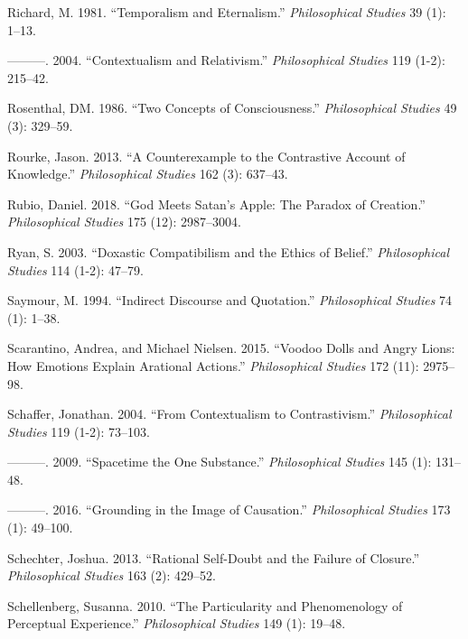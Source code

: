\documentclass[
  10pt,
  letterpaper,
  DIV=11,
  numbers=noendperiod,
  twoside]{scrartcl}
\newlength{\cslhangindent}
\newenvironment{CSLReferences}[2] %
 {\begin{list}{}{%
  \setlength{\itemindent}{0pt}
  \setlength{\leftmargin}{0pt}
  \setlength{\parsep}{0pt}
  \ifodd #1
   \setlength{\leftmargin}{\cslhangindent}
   \setlength{\itemindent}{-1\cslhangindent}
  \fi
  \setlength{\itemsep}{#2\baselineskip}}}
 {\end{list}}
\begin{document}
\begin{CSLReferences}{1}{0}
Richard, M. 1981. {``Temporalism and Eternalism.''} \emph{Philosophical
Studies} 39 (1): 1--13.

---------. 2004. {``Contextualism and Relativism.''} \emph{Philosophical
Studies} 119 (1-2): 215--42.

Rosenthal, DM. 1986. {``Two Concepts of Consciousness.''}
\emph{Philosophical Studies} 49 (3): 329--59.

Rourke, Jason. 2013. {``A Counterexample to the Contrastive Account of
Knowledge.''} \emph{Philosophical Studies} 162 (3): 637--43.

Rubio, Daniel. 2018. {``God Meets Satan's Apple: The Paradox of
Creation.''} \emph{Philosophical Studies} 175 (12): 2987--3004.

Ryan, S. 2003. {``Doxastic Compatibilism and the Ethics of Belief.''}
\emph{Philosophical Studies} 114 (1-2): 47--79.

Saymour, M. 1994. {``Indirect Discourse and Quotation.''}
\emph{Philosophical Studies} 74 (1): 1--38.

Scarantino, Andrea, and Michael Nielsen. 2015. {``Voodoo Dolls and Angry
Lions: How Emotions Explain Arational Actions.''} \emph{Philosophical
Studies} 172 (11): 2975--98.

Schaffer, Jonathan. 2004. {``From Contextualism to Contrastivism.''}
\emph{Philosophical Studies} 119 (1-2): 73--103.

---------. 2009. {``Spacetime the One Substance.''} \emph{Philosophical
Studies} 145 (1): 131--48.

---------. 2016. {``Grounding in the Image of Causation.''}
\emph{Philosophical Studies} 173 (1): 49--100.

Schechter, Joshua. 2013. {``Rational Self-Doubt and the Failure of
Closure.''} \emph{Philosophical Studies} 163 (2): 429--52.

Schellenberg, Susanna. 2010. {``The Particularity and Phenomenology of
Perceptual Experience.''} \emph{Philosophical Studies} 149 (1): 19--48.


\end{CSLReferences}
\end{document}
